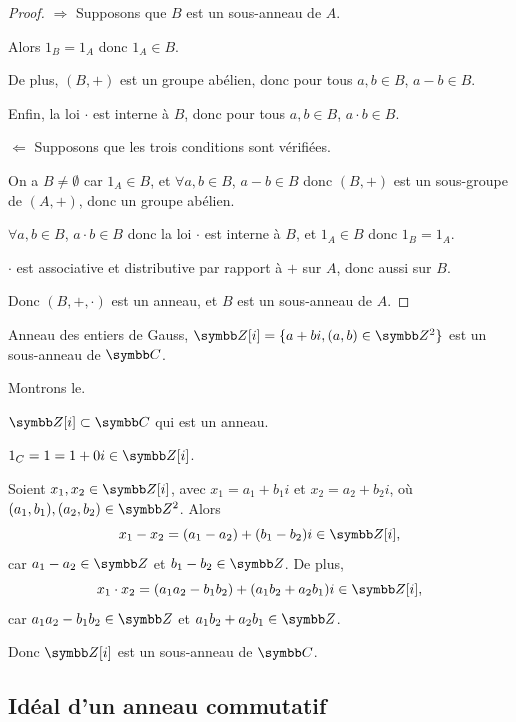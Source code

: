 \begin{proof} $\Rightarrow$ Supposons que $B$ est un sous-anneau de $A$.
    
    Alors $1_B = 1_A$ donc $1_A \in B$.

    De plus, $(B, +)$ est un groupe abélien, donc pour tous $a, b \in B$, $a - b \in B$.

    Enfin, la loi $\cdot$ est interne à $B$, donc pour tous $a, b \in B$, $a \cdot b \in B$.

    \avspace $\Leftarrow$ Supposons que les trois conditions sont vérifiées.

    On a $B \neq \emptyset$ car $1_A \in B$, et $\forall a, b \in B$, $a - b \in B$ donc $(B, +)$ est un sous-groupe de $(A, +)$,
    donc un groupe abélien.

    $\forall a, b \in B$, $a \cdot b \in B$ donc la loi $\cdot$ est interne à $B$, et 
    $1_A \in B$ donc $1_B = 1_A$.

    $\cdot$ est associative et distributive par rapport à $+$ sur $A$, donc aussi sur $B$.

    Donc $(B, +, \cdot)$ est un anneau, et $B$ est un sous-anneau de $A$.
\end{proof}

\begin{exemple}
    Anneau des entiers de Gauss, $\Z[i] = \{a + bi , (a, b) \in \Z^2\}$ est un sous-anneau de $\C$.

    Montrons le. 

    $\Z[i] \subset \C$ qui est un anneau.

    $1_C = 1 = 1 + 0i \in \Z[i]$.

    Soient $x_1, x_2 \in \Z[i]$, avec $x_1 = a_1 + b_1 i$ et $x_2 = a_2 + b_2 i$,
    où $(a_1, b_1), (a_2, b_2) \in \Z^2$.
    Alors
    \[
        x_1 - x_2 = (a_1 - a_2) + (b_1 - b_2)i \in \Z[i],
    \]
    car $a_1 - a_2 \in \Z$ et $b_1 - b_2 \in \Z$.
    De plus,
    \[
        x_1 \cdot x_2 = (a_1 a_2 - b_1 b_2) + (a_1 b_2 + a_2 b_1)i \in \Z[i],
    \]
    car $a_1 a_2 - b_1 b_2 \in \Z$ et $a_1 b_2 + a_2 b_1 \in \Z$.

    Donc $\Z[i]$ est un sous-anneau de $\C$.
\end{exemple}

\subsection{Idéal d'un anneau commutatif }


